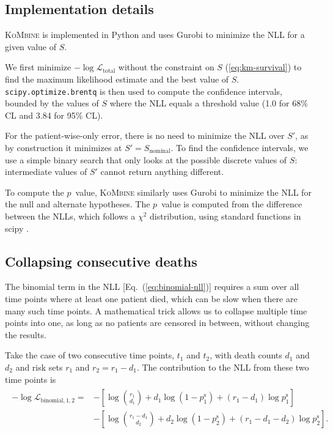 \documentclass[pdflatex,sn-basic]{sn-jnl}%
\theoremstyle{thmstyleone}%
\theoremstyle{thmstyletwo}%
\theoremstyle{thmstylethree}%
\newcommand{\KoMbine}{\textsc{KoMbine}}
\newcommand{\Python}{Python}
\newcommand{\scipy}{scipy}
\newcommand{\Gurobi}{Gurobi}
\begin{document}
\begin{appendices}

\section{Implementation details}\label{sec:implementation-details}

\KoMbine{} is implemented in \Python{} and uses \Gurobi{} \citep{gurobi} to minimize the NLL for a given value of \(S\).

We first minimize \(-\log \mathcal{L}_{\text{total}}\) without the constraint on \(S\) (\ref{eq:km-survival}) to find the maximum likelihood estimate and the best value of \(S\)\@. \texttt{scipy.optimize.brentq} \citep{brentq,scipy} is then used to compute the confidence intervals, bounded by the values of \(S\) where the NLL equals a threshold value (1.0 for 68\% CL and 3.84 for 95\% CL).

For the patient-wise-only error, there is no need to minimize the NLL over \(S'\), as by construction it minimizes at \(S'=S_\text{nominal}\). To find the confidence intervals, we use a simple binary search that only looks at the possible discrete values of \(S\): intermediate values of \(S'\) cannot return anything different.

To compute the \(p\)~value, \KoMbine{} similarly uses \Gurobi{} to minimize the NLL for the null and alternate hypotheses. The \(p\)~value is computed from the difference between the NLLs, which follows a \(\chi^2\) distribution, using standard functions in \scipy{} \citep{scipy}.

\subsection{Collapsing consecutive deaths}

The binomial term in the NLL [Eq.~(\ref{eq:binomial-nll})] requires a sum over all time points where at least one patient died, which can be slow when there are many such time points. A mathematical trick allows us to collapse multiple time points into one, as long as no patients are censored in between, without changing the results.

Take the case of two consecutive time points, \(t_1\) and \(t_{2}\), with death counts \(d_1\) and \(d_{2}\) and risk sets \(r_1\) and \(r_{2}=r_1-d_1\)\@.  The contribution to the NLL from these two time points is
\begin{align}
\begin{aligned}
-\log \mathcal{L}_{\text{binomial},1,2} =&-\left[\log\binom{r_1}{d_1} + d_1 \log \left(1-p_1^\text{s}\right) + (r_1-d_1) \log p_1^\text{s}\right] \\
&-\left[\log\binom{r_{1}-d_{1}}{d_{2}} + d_{2} \log \left(1-p_{2}^\text{s}\right) + (r_{1}-d_{1}-d_{2}) \log p_{2}^\text{s}\right].
\end{aligned}
\label{eq:two-timepoints-nll}
\end{align}


\end{appendices}
\end{document}
